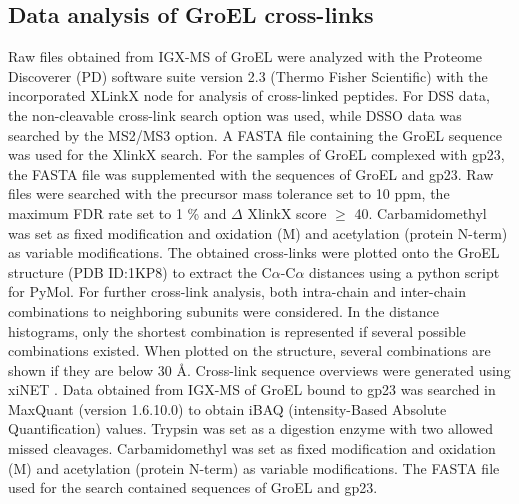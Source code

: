 \subsection*{Data analysis of GroEL cross-links}
Raw files obtained from IGX-MS of GroEL were analyzed with the Proteome Discoverer (PD) software suite version 2.3 (Thermo Fisher Scientific) with the incorporated XLinkX node for analysis of cross-linked peptides. For DSS data, the non-cleavable cross-link search option was used, while DSSO data was searched by the MS2/MS3 option. A FASTA file containing the GroEL sequence was used for the XlinkX search. For the samples of GroEL complexed with gp23, the FASTA file was supplemented with the sequences of GroEL and gp23. Raw files were searched with the precursor mass tolerance set to 10 ppm, the maximum FDR rate set to 1 \% and $\Delta$ XlinkX score $\geq$ 40. Carbamidomethyl was set as fixed modification and oxidation (M) and acetylation (protein N-term) as variable modifications. The obtained cross-links were plotted onto the GroEL structure (PDB ID:1KP8) to extract the C$\alpha$-C$\alpha$ distances using a python script for PyMol. For further cross-link analysis, both intra-chain and inter-chain combinations to neighboring subunits were considered. In the distance histograms, only the shortest combination is represented if several possible combinations existed. When plotted on the structure, several combinations are shown if they are below 30 Å. Cross-link sequence overviews were generated using xiNET \cite{Combe_2015}. Data obtained from IGX-MS of GroEL bound to gp23 was searched in MaxQuant (version 1.6.10.0) to obtain iBAQ (intensity-Based Absolute Quantification) values. Trypsin was set as a digestion enzyme with two allowed missed cleavages. Carbamidomethyl was set as fixed modification and oxidation (M) and acetylation (protein N-term) as variable modifications. The FASTA file used for the search contained sequences of GroEL and gp23.

